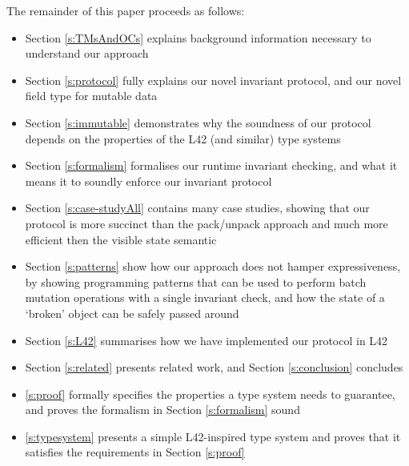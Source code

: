 The remainder of this paper proceeds as follows:
\begin{itemize}
	\item Section \ref{s:TMsAndOCs} explains background information necessary to understand our approach
	\item Section \ref{s:protocol} fully explains our novel invariant protocol, and our novel field type for mutable data
	\item Section \ref{s:immutable} demonstrates why the soundness of our protocol depends on the properties of the L42 (and similar) type systems
	\item Section \ref{s:formalism} formalises our runtime invariant checking, and what it means it to soundly enforce our invariant protocol
	\item Section \ref{s:case-studyAll} contains many case studies, showing that our protocol is more succinct than the pack/unpack approach and much more efficient then the visible state semantic
	\item Section \ref{s:patterns} show how our approach does not hamper expressiveness, by showing programming patterns that can be used to perform batch mutation operations with a single invariant check, and how the state of a `broken' object can be safely passed around
	\item Section \ref{s:L42} summarises how we have implemented our protocol in L42
	\item Section \ref{s:related} presents related work, and Section \ref{s:conclusion} concludes
	\item \ref{s:proof} formally specifies the properties a type system needs to guarantee, and proves the formalism in Section \ref{s:formalism} sound
	\item \ref{s:typesystem} presents a simple L42-inspired type system and proves that it satisfies the requirements in Section \ref{s:proof}	
\end{itemize}




